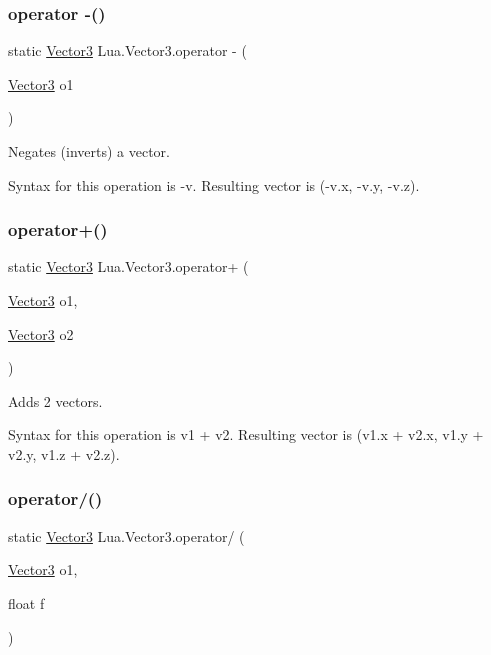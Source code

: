 \subsubsection{\texorpdfstring{operator -\/()}{operator -()}\hspace{0.1cm}{\footnotesize\ttfamily [2/2]}}
{\footnotesize\ttfamily static \mbox{\hyperlink{class_lua_1_1_vector3}{Vector3}} Lua.\+Vector3.\+operator -\/ (\begin{DoxyParamCaption}\item[{\mbox{\hyperlink{class_lua_1_1_vector3}{Vector3}}}]{o1 }\end{DoxyParamCaption})\hspace{0.3cm}{\ttfamily [static]}}



Negates (inverts) a vector. 

Syntax for this operation is {\ttfamily -\/v}. Resulting vector is {\ttfamily (-\/v.\+x, -\/v.\+y, -\/v.\+z)}. \mbox{\label{class_lua_1_1_vector3_ae40267fccb8c1e9d79d704776b07e949}} 
\subsubsection{\texorpdfstring{operator+()}{operator+()}}
{\footnotesize\ttfamily static \mbox{\hyperlink{class_lua_1_1_vector3}{Vector3}} Lua.\+Vector3.\+operator+ (\begin{DoxyParamCaption}\item[{\mbox{\hyperlink{class_lua_1_1_vector3}{Vector3}}}]{o1,  }\item[{\mbox{\hyperlink{class_lua_1_1_vector3}{Vector3}}}]{o2 }\end{DoxyParamCaption})\hspace{0.3cm}{\ttfamily [static]}}



Adds 2 vectors. 

Syntax for this operation is {\ttfamily v1 + v2}. Resulting vector is {\ttfamily (v1.\+x + v2.\+x, v1.\+y + v2.\+y, v1.\+z + v2.\+z)}. \mbox{\label{class_lua_1_1_vector3_a2e065e07d84200e5a9cec3270ef1d30f}} 
\subsubsection{\texorpdfstring{operator/()}{operator/()}}
{\footnotesize\ttfamily static \mbox{\hyperlink{class_lua_1_1_vector3}{Vector3}} Lua.\+Vector3.\+operator/ (\begin{DoxyParamCaption}\item[{\mbox{\hyperlink{class_lua_1_1_vector3}{Vector3}}}]{o1,  }\item[{float}]{f }\end{DoxyParamCaption})\hspace{0.3cm}{\ttfamily [static]}}



